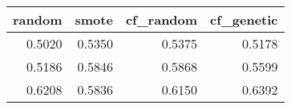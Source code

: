 \begin{tabular}{rrrr}
\toprule

 random &  smote &  cf\_random &  cf\_genetic \\
\midrule

 0.5020 & 0.5350 &     0.5375 &      0.5178 \\
 0.5186 & 0.5846 &     0.5868 &      0.5599 \\
 0.6208 & 0.5836 &     0.6150 &      0.6392 \\

\bottomrule
\end{tabular}
